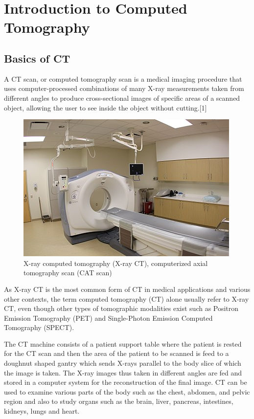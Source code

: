 \documentclass[12pt]{article}
\begin{document}

\tableofcontents
\pagebreak


\section{Introduction to Computed Tomography}
\subsection{Basics of CT}
A CT scan, or computed tomography scan is a medical imaging procedure that uses computer-processed combinations of many X-ray measurements taken from different angles to produce cross-sectional images of specific areas of a scanned object, allowing the user to see inside the object without cutting.[1] 

\begin{figure}[h!]
  \centering
  \includegraphics[width=0.45\linewidth]{CT.jpg}
  \caption{\small{X-ray computed tomography (X-ray CT), computerized axial tomography scan (CAT scan)}}
  \label{fig:CT scan}
\end{figure}
As X-ray CT is the most common form of CT in medical applications and various other contexts, the term computed tomography (CT) alone usually refer to X-ray CT, even though other types of tomographic modalities exist such as Positron Emission Tomography (PET) and Single-Photon Emission Computed Tomography (SPECT).

The CT machine consists of a patient support table where the patient is rested for the CT scan and then the area of the patient to be scanned is feed to a doughnut shaped gantry which sends X-rays parallel to the body slice of which the image is taken. The X-ray images thus taken in different angles are fed and stored in a computer system for the reconstruction of the final image. CT can be used to examine various parts of the body such as the chest, abdomen, and pelvic region and also to study organs such as the brain, liver, pancreas, intestines, kidneys, lungs and heart.
\end{document}
